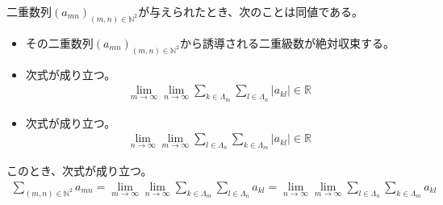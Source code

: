 \documentclass[dvipdfmx]{jsarticle}
\begin{document}
\begin{thm}\label{4.1.9.6}
二重数列$\left( a_{mn} \right)_{(m,n) \in \mathbb{N}^{2}}$が与えられたとき、次のことは同値である。
\begin{itemize}
\item
  その二重数列$\left( a_{mn} \right)_{(m,n) \in \mathbb{N}^{2}}$から誘導される二重級数が絶対収束する。
\item
  次式が成り立つ。
\begin{align*}
\lim_{m \rightarrow \infty}{\lim_{n \rightarrow \infty}{\sum_{k \in \varLambda_{m}}{\sum_{l \in \varLambda_{n}}\left| a_{kl} \right|}}} \in \mathbb{R}
\end{align*}
\item
  次式が成り立つ。
\begin{align*}
\lim_{n \rightarrow \infty}{\lim_{m \rightarrow \infty}{\sum_{l \in \varLambda_{n}}{\sum_{k \in \varLambda_{m}}\left| a_{kl} \right|}}} \in \mathbb{R}
\end{align*}
\end{itemize}
このとき、次式が成り立つ。
\begin{align*}
\sum_{(m,n) \in \mathbb{N}^{2}}a_{mn} = \lim_{m \rightarrow \infty}{\lim_{n \rightarrow \infty}{\sum_{k \in \varLambda_{m}}{\sum_{l \in \varLambda_{n}}a_{kl}}}} = \lim_{n \rightarrow \infty}{\lim_{m \rightarrow \infty}{\sum_{l \in \varLambda_{n}}{\sum_{k \in \varLambda_{m}}a_{kl}}}}
\end{align*}
\end{thm}
\end{document}
